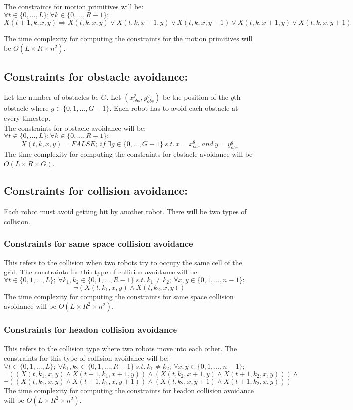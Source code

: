 \documentclass{article}[11pt]
\begin{document}
			The constraints for motion primitives will be:\\
			$\forall{t \in \{0,...,L\}};\forall{k \in \{0,...,R-1\}};$
			$$
				X(t+1, k, x, y) \Rightarrow X(t,k,x,y)\vee X(t,k,x-1,y)\vee X(t,k,x,y-1)\vee X(t,k,x+1,y)\vee X(t,k,x,y+1)
			$$

			The time complexity for computing the constraints for the motion primitives will be $O(L \times R\times n^2)$.

		\subsection{Constraints for obstacle avoidance:}
			Let the number of obstacles be $G$. Let $(x_{obs}^g, y_{obs}^g)$ be the position of the $g$th obstacle where $g \in \{0, 1, . . . , G-1\}$. Each robot has to avoid each obstacle at every timestep.\\
			The constraints for obstacle avoidance will be:\\
			$\forall{t \in \{0,...,L\}};\forall{k \in \{0,...,R-1\}};$
			$$
				X(t, k, x, y) = FALSE;\ if\ \exists g \in \{0,...,G-1\}\ s.t.\ x=x_{obs}^g\ and\ y=y_{obs}^g
			$$
			The time complexity for computing the constraints for obstacle avoidance will be $O(L \times R\times G)$.

		\subsection{Constraints for collision avoidance:}
			Each robot must avoid getting hit by another robot. There will be two types of collision.
			\subsubsection{Constraints for same space collision avoidance}
				This refers to the collision when two robots try to occupy the same cell of the grid. The constraints for this type of collision avoidance will be:\\
				$\forall t \in \{0, 1, ..., L\};\ \forall k_1,k_2 \in \{0, 1, ..., R-1\}\ s.t.\ k_1 \neq k_2;\ \forall x,y \in \{0,1,...,n-1\};$
				$$
					\neg (X(t, k_1, x, y) \wedge X(t, k_2, x, y))
				$$
				The time complexity for computing the constraints for same space collision avoidance will be
				$O(L \times R^2 \times n^2)$.
			\subsubsection{Constraints for headon collision avoidance}
				This refers to the collision type where two robots move into each other. The constraints for this type of collision avoidance will be:\\
				$\forall t \in \{0, 1, ..., L\};\ \forall k_1,k_2 \in \{0, 1, ..., R-1\}\ s.t.\ k_1 \neq k_2;\ \forall x,y \in \{0,1,...,n-1\};$
				$$
					\neg((X(t, k_1, x, y) \wedge X(t+1, k_1, x+1, y)) \wedge (X(t, k_2, x+1, y) \wedge X(t+1, k_2, x, y))) \wedge
				$$
				$$
					\neg((X(t, k_1, x, y) \wedge X(t+1, k_1, x, y+1)) \wedge (X(t, k_2, x, y+1) \wedge X(t+1, k_2, x, y)))
				$$
				The time complexity for computing the constraints for headon collision avoidance will be
				$O(L \times R^2 \times n^2)$.
\end{document}
